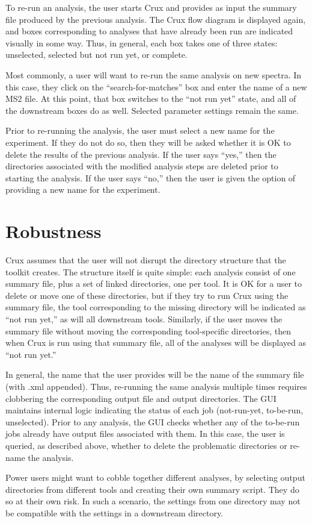 \documentclass{article}
\begin{document}
To re-run an analysis, the user starts Crux and provides as input the
summary file produced by the previous analysis.  The Crux flow diagram
is displayed again, and boxes corresponding to analyses that have
already been run are indicated visually in some way.  Thus, in
general, each box takes one of three states: unselected, selected but
not run yet, or complete.

Most commonly, a user will want to re-run the same analysis on new
spectra.  In this case, they click on the ``search-for-matches'' box
and enter the name of a new MS2 file.  At this point, that box
switches to the ``not run yet'' state, and all of the downstream boxes
do as well.  Selected parameter settings remain the same.

Prior to re-running the analysis, the user must select a new name for
the experiment.  If they do not do so, then they will be asked whether
it is OK to delete the results of the previous analysis.  If the user
says ``yes,'' then the directories associated with the modified
analysis steps are deleted prior to starting the analysis.  If the
user says ``no,'' then the user is given the option of providing a new
name for the experiment.

\section{Robustness}

Crux assumes that the user will not disrupt the directory structure
that the toolkit creates.  The structure itself is quite simple: each
analysis consist of one summary file, plus a set of linked
directories, one per tool.  It is OK for a user to delete or move one
of these directories, but if they try to run Crux using the summary
file, the tool corresponding to the missing directory will be
indicated as ``not run yet,'' as will all downstream tools.
Similarly, if the user moves the summary file without moving the
corresponding tool-specific directories, then when Crux is run using
that summary file, all of the analyses will be displayed as ``not run
yet.''

In general, the name that the user provides will be the name of the
summary file (with .xml appended).  Thus, re-running the same analysis
multiple times requires clobbering the corresponding output file and
output directories.  The GUI maintains internal logic indicating the
status of each job (not-run-yet, to-be-run, unselected).  Prior to any
analysis, the GUI checks whether any of the to-be-run jobs already
have output files associated with them.  In this case, the user is
queried, as described above, whether to delete the problematic
directories or re-name the analysis.

Power users might want to cobble together different analyses, by
selecting output directories from different tools and creating their
own summary script.  They do so at their own risk.  In such a
scenario, the settings from one directory may not be compatible with
the settings in a downstream directory.
\end{document}
